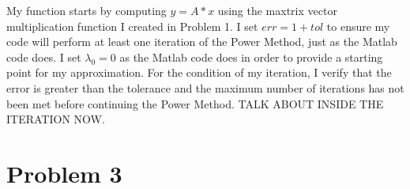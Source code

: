 \documentclass[11pt]{article}
\begin{document}
My function starts by computing $y=A*x$ using the maxtrix vector multiplication function I created in Problem 1. I set $err=1+tol$ to ensure my code will perform at least one iteration of the Power Method, just as the Matlab code does. I set $\lambda_{0}=0$ as the Matlab code does in order to provide a starting point for my approximation. For the condition of my iteration, I verify that the error is greater than the tolerance and the maximum number of iterations has not been met before continuing the Power Method. TALK ABOUT INSIDE THE ITERATION NOW.


\pagebreak

\section{Problem 3}
\end{document}
